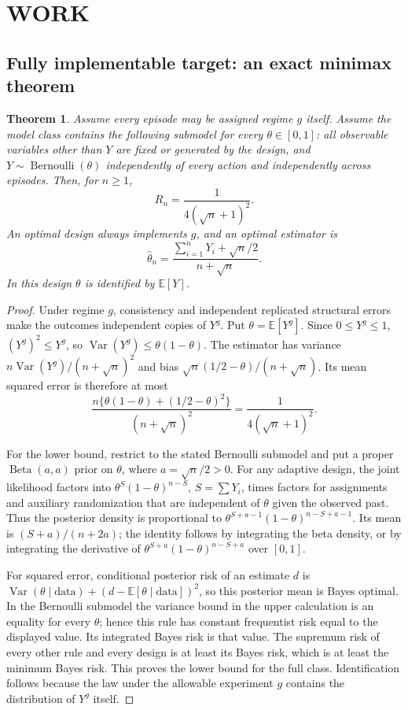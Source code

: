 \documentclass[11pt,a4paper]{article}
\newtheorem{theorem}{Theorem}[section]
\theoremstyle{remark}\newtheorem{remark}[theorem]{Remark}
\newcommand{\E}{\mathbb E}
\newcommand{\Var}{\operatorname{Var}}
\begin{document}
\section{WORK}
\subsection{Fully implementable target: an exact minimax theorem}
\begin{theorem}\label{thm:exactrisk}
Assume every episode may be assigned regime $g$ itself. Assume the model class contains the following submodel for every $\theta\in[0,1]$: all observable variables other than $Y$ are fixed or generated by the design, and $Y\sim\operatorname{Bernoulli}(\theta)$ independently of every action and independently across episodes. Then, for $n\ge1$,
\[
R_n=\frac{1}{4(\sqrt n+1)^2}.
\]
An optimal design always implements $g$, and an optimal estimator is
\[
\widehat\theta_n=\frac{\sum_{i=1}^nY_i+\sqrt n/2}{n+\sqrt n}.
\]
In this design $\theta$ is identified by $\E[Y]$.
\end{theorem}
\begin{proof}
Under regime $g$, consistency and independent replicated structural errors make the outcomes independent copies of $Y^g$. Put $\theta=\E[Y^g]$. Since $0\le Y^g\le1$, $(Y^g)^2\le Y^g$, so $\Var(Y^g)\le\theta(1-\theta)$. The estimator has variance $n\Var(Y^g)/(n+\sqrt n)^2$ and bias $\sqrt n(1/2-\theta)/(n+\sqrt n)$. Its mean squared error is therefore at most
\[
\frac{n\{\theta(1-\theta)+(1/2-\theta)^2\}}{(n+\sqrt n)^2}
=\frac1{4(\sqrt n+1)^2}.
\]

For the lower bound, restrict to the stated Bernoulli submodel and put a proper $\operatorname{Beta}(a,a)$ prior on $\theta$, where $a=\sqrt n/2>0$. For any adaptive design, the joint likelihood factors into $\theta^{S}(1-\theta)^{n-S}$, $S=\sum Y_i$, times factors for assignments and auxiliary randomization that are independent of $\theta$ given the observed past. Thus the posterior density is proportional to $\theta^{S+a-1}(1-\theta)^{n-S+a-1}$. Its mean is $(S+a)/(n+2a)$; the identity follows by integrating the beta density, or by integrating the derivative of $\theta^{S+a}(1-\theta)^{n-S+a}$ over $[0,1]$.

For squared error, conditional posterior risk of an estimate $d$ is $\Var(\theta\mid\text{data})+(d-\E[\theta\mid\text{data}])^2$, so this posterior mean is Bayes optimal. In the Bernoulli submodel the variance bound in the upper calculation is an equality for every $\theta$; hence this rule has constant frequentist risk equal to the displayed value. Its integrated Bayes risk is that value. The supremum risk of every other rule and every design is at least its Bayes risk, which is at least the minimum Bayes risk. This proves the lower bound for the full class. Identification follows because the law under the allowable experiment $g$ contains the distribution of $Y^g$ itself.
\end{proof}
\end{document}
